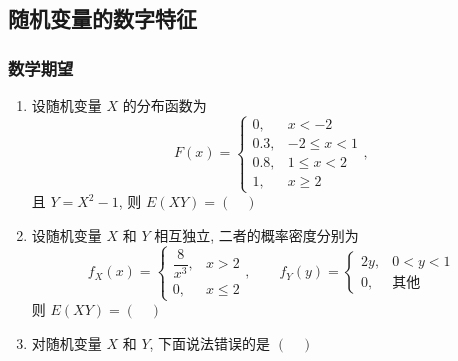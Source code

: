 \subsection{随机变量的数字特征}

\subsubsection{数学期望}

\begin{enumerate}
  \item 设随机变量 $X$ 的分布函数为
  \begin{equation*}
    F(x)=
    \begin{cases}
      0,   & x<-2\\
      0.3, & -2\le x<1\\
      0.8, & 1\le x<2\\
      1,   & x\ge 2
    \end{cases},
  \end{equation*}
  且 $Y=X^{2}-1$, 则 $E(XY)=(\quad)$

  \item 设随机变量 $X$ 和 $Y$ 相互独立, 二者的概率密度分别为
  \begin{equation*}
    f_X(x)=
    \begin{cases}
      \dfrac{8}{x^{3}}, & x>2\\
      0,                & x\le 2
    \end{cases},
    \qquad
    f_Y(y)=
    \begin{cases}
      2y, & 0<y<1\\
      0,  & \text{其他}
    \end{cases}
  \end{equation*}
  则 $E(XY)=(\quad)$

  \item 对随机变量 $X$ 和 $Y$, 下面说法错误的是 $(\quad)$


\end{enumerate}

